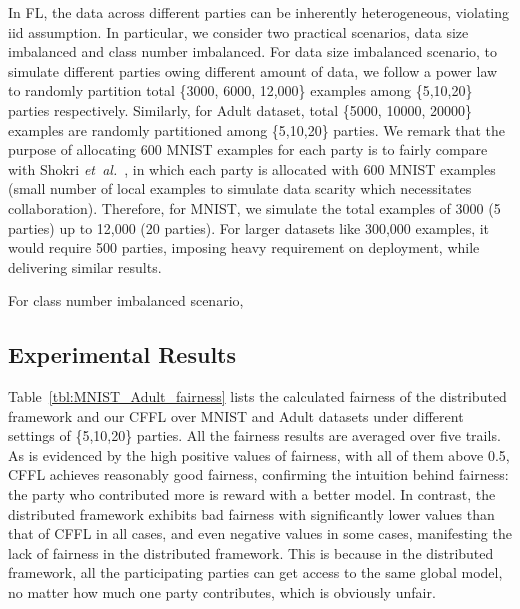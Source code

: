 \documentclass{article}
\newcommand{\etal}{\textit{et~al.}\xspace}
\begin{document}
In FL, the data across different parties can be inherently heterogeneous, violating iid assumption. In particular, we consider two practical scenarios, data size imbalanced and class number imbalanced.
For data size imbalanced scenario, to simulate %
different parties owing different amount of data, we follow a power law to randomly partition total \{3000, 6000, 12,000\} examples among \{5,10,20\} parties respectively. Similarly, for Adult dataset, total \{5000, 10000, 20000\} examples are randomly partitioned among \{5,10,20\} parties. 
We remark that the purpose of allocating $600$ MNIST examples for each party is to fairly compare with Shokri \etal~\cite{shokri2015privacy}, in which each party is allocated with 600 MNIST examples (small number of local examples to simulate data scarity which necessitates collaboration). Therefore, for MNIST, we simulate the total examples of 3000 (5 parties) up to 12,000 (20 parties). For larger datasets like 300,000 examples, it would require 500 parties, imposing heavy requirement on deployment, while delivering similar results.%

For class number imbalanced scenario, 

\subsection{Experimental Results}
\label{sec:results}
Table~\ref{tbl:MNIST_Adult_fairness} lists the calculated fairness of the distributed framework and our CFFL over MNIST and Adult datasets under different settings of \{5,10,20\} parties.%
All the fairness results %
are averaged over five trails. As is evidenced by the high positive values of fairness, with all of them above 0.5, CFFL achieves reasonably good fairness, confirming the intuition behind fairness: the party who %
contributed more is reward with a better model. In contrast, the distributed framework exhibits bad fairness with significantly lower values than that of CFFL in all cases, and even negative values in some cases, manifesting the lack of fairness in the distributed framework. This is because in the distributed framework, all the participating parties can get access to the same global model, no matter how much one party contributes, which is obviously unfair.
\end{document}
